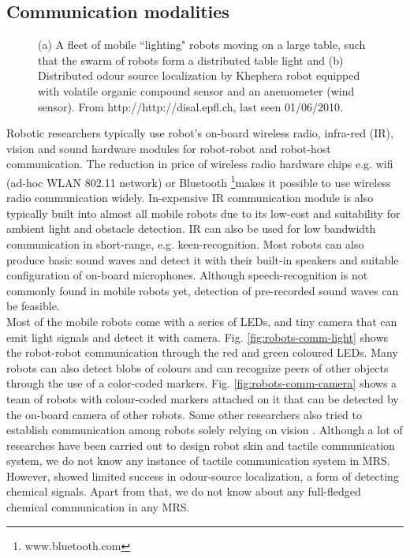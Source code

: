 \subsection{Communication modalities}
\begin{figure}
\centering
{} 
\hspace{0.25cm}
\caption{ (a) A fleet of mobile ``lighting" robots moving on a large table, such that the swarm of robots form a distributed table light and (b) Distributed odour source localization by Khephera robot equipped with volatile organic compound sensor and an anemometer (wind sensor). From http://http://disal.epfl.ch, last seen 01/06/2010.}
\label{fig:epfl-disal}
\end{figure}
Robotic researchers typically use robot's on-board wireless radio, infra-red (IR), vision and sound hardware modules for robot-robot and robot-host communication. The reduction in price of wireless radio hardware chips e.g. wifi (ad-hoc WLAN 802.11 network) or Bluetooth \footnote{www.bluetooth.com}makes it possible to use wireless radio communication widely. In-expensive IR communication module is also typically built into almost all mobile robots due to its low-cost and suitability for ambient light and obstacle detection. IR can also be used for low bandwidth communication in short-range, e.g. keen-recognition. Most robots can also produce basic sound waves and detect it with their built-in speakers and suitable configuration of on-board microphones. Although speech-recognition is not commonly found in mobile robots yet, detection of pre-recorded sound waves can be feasible.\\
Most of the mobile robots come with a series of LEDs, and tiny camera that can emit light signals and detect it with camera. Fig. \ref{fig:robots-comm-light} shows the robot-robot communication through the red and green coloured LEDs. Many robots can also detect blobs of colours and can recognize peers of other objects through the use of a color-coded markers. Fig. \ref{fig:robots-comm-camera} shows a team of robots with colour-coded markers attached on it that can be detected by the on-board camera of other robots. Some other researchers also tried to establish communication among robots solely relying on vision \cite{Kuniyoshi1994}. Although a lot of researches have been carried out to design robot skin and tactile communication system, we do not know any instance of tactile communication system in MRS. However,  showed  limited success in odour-source localization, a form of detecting chemical signals. Apart from that, we do not know about any full-fledged chemical communication in any MRS. 
